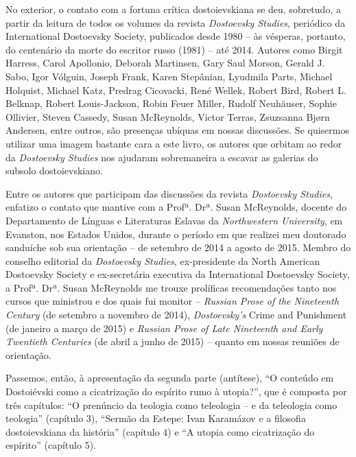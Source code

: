No exterior, o contato com a fortuna crítica dostoievskiana se deu,
sobretudo, a partir da leitura de todos os volumes da revista
\emph{Dostoevsky Studies}, periódico da International Dostoevsky
Society, publicados desde 1980 -- às vésperas, portanto, do centenário
da morte do escritor russo (1981) -- até 2014. Autores como Birgit
Harress, Carol Apollonio, Deborah Martinsen, Gary Saul Morson, Gerald J.
Sabo, Igor Vólguin, Joseph Frank, Karen Stepânian, Lyudmila Parts,
Michael Holquist, Michael Katz, Predrag Cicovacki, René Wellek, Robert
Bird, Robert L. Belknap, Robert Louis-Jackson, Robin Feuer Miller,
Rudolf Neuhäuser, Sophie Ollivier, Steven Cassedy, Susan McReynolds,
Victor Terras, Zsuzsanna Bjørn Andersen, entre outros, são presenças
ubíquas em nossas discussões. Se quisermos utilizar uma imagem bastante
cara a este livro, os autores que orbitam ao redor da \emph{Dostoevsky
Studies} nos ajudaram sobremaneira a escavar as galerias do subsolo
dostoievskiano.

Entre os autores que participam das discussões da revista
\emph{Dostoevsky Studies}, enfatizo o contato que mantive com a Profª.
Drª. Susan McReynolds, docente do Departamento de Línguas e Literaturas
Eslavas da \emph{Northwestern University}, em Evanston, nos Estados
Unidos, durante o período em que realizei meu doutorado sanduíche sob
sua orientação -- de setembro de 2014 a agosto de 2015. Membro do
conselho editorial da \emph{Dostoevsky Studies}, ex-presidente da North
American Dostoevsky Society e ex-secretária executiva da International
Dostoevsky Society, a Profª. Drª. Susan McReynolds me trouxe prolíficas
recomendações tanto nos cursos que ministrou e dos quais fui monitor --
\emph{Russian Prose of the Nineteenth Century} (de setembro a novembro
de 2014), \emph{Dostoevsky's} Crime and Punishment (de janeiro a março
de 2015) e \emph{Russian Prose of Late Nineteenth and Early Twentieth
Centuries} (de abril a junho de 2015) -- quanto em nossas reuniões de
orientação.

Passemos, então, à apresentação da segunda parte (antítese), ``O
conteúdo em Dostoiévski como a cicatrização do espírito rumo à
utopia?'', que é composta por três capítulos: ``O prenúncio da teologia
como teleologia -- e da teleologia como teologia'' (capítulo 3),
``Sermão da Estepe: Ivan Karamázov e a filosofia dostoievskiana da
história'' (capítulo 4) e ``A utopia como cicatrização do espírito''
(capítulo 5).

